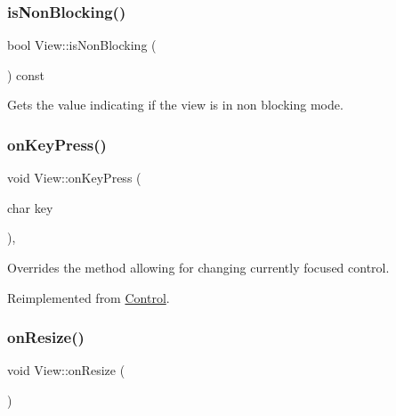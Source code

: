 \mbox{\label{class_view_afd9ac571a451efbab5ffa0a04bbef450}} 
\subsubsection{\texorpdfstring{isNonBlocking()}{isNonBlocking()}}
{\footnotesize\ttfamily bool View\+::is\+Non\+Blocking (\begin{DoxyParamCaption}{ }\end{DoxyParamCaption}) const}



Gets the value indicating if the view is in non blocking mode. 

\mbox{\label{class_view_ab391ca9800c413c543be7f2f6b9716d2}} 
\subsubsection{\texorpdfstring{onKeyPress()}{onKeyPress()}}
{\footnotesize\ttfamily void View\+::on\+Key\+Press (\begin{DoxyParamCaption}\item[{char}]{key }\end{DoxyParamCaption})\hspace{0.3cm}{\ttfamily [override]}, {\ttfamily [virtual]}}



Overrides the method allowing for changing currently focused control. 



Reimplemented from \mbox{\hyperlink{class_control_a4731a62a9ea0510d51924509ae74c93e}{Control}}.

\mbox{\label{class_view_ae78c9a069c50811e0bd5e61dbf5f4f6c}} 
\subsubsection{\texorpdfstring{onResize()}{onResize()}}
{\footnotesize\ttfamily void View\+::on\+Resize (\begin{DoxyParamCaption}{ }\end{DoxyParamCaption})}



